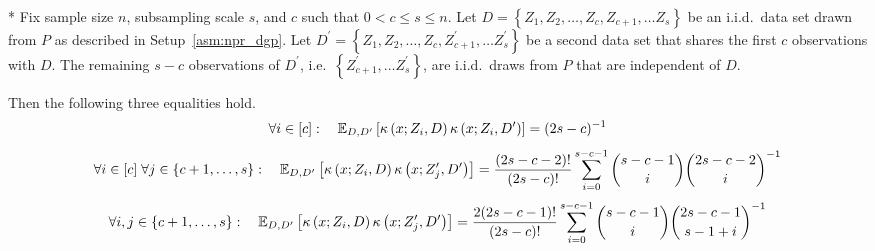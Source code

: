 \begin{lem}[]\label{lem:double_cond1}\mbox{}\\*
    Fix sample size $n$, subsampling scale $s$, and $c$ such that $0 < c \leq s \leq n$.
	Let $D = \left\{Z_1, Z_2, \dotsc, Z_c, Z_{c+1}, \dotsc Z_s \right\}$ be an i.i.d.\ data set drawn from $P$ as described in Setup~\ref{asm:npr_dgp}.
	Let $D^{\prime} = \left\{Z_1, Z_2, \dotsc, Z_c, Z_{c+1}^{\prime}, \dotsc Z_s^{\prime} \right\}$ be a second data set that shares the first $c$ observations with $D$.
	The remaining $s - c$ observations of $D^{\prime}$, i.e.\ $\left\{Z_{c+1}^{\prime}, \dotsc Z_s^{\prime} \right\}$, are i.i.d.\ draws from $P$ that are independent of $D$.

    Then the following three equalities hold.
    \begin{equation}
        \forall i \in [c]: \quad
        \mathbb{E}_{D, D^{\prime}}\left[\kappa\left(x; Z_{i}, D\right)\kappa\left(x; Z_{i}, D^{\prime}\right)\right]
        = (2s - c)^{-1}
    \end{equation}
    \begin{equation}
        \forall i \in [c] \; \forall j \in \{c+1, \dotsc, s\}: \quad
        \mathbb{E}_{D, D^{\prime}}\left[\kappa\left(x; Z_{i}, D\right)\kappa\left(x; Z_{j}^{\prime}, D^{\prime}\right)\right]
        = \frac{(2s - c - 2)!}{(2s - c)!}\sum_{i = 0}^{s - c - 1}\binom{s - c - 1}{i}\binom{2s - c - 2}{i}^{-1}
    \end{equation}
    \begin{equation}
        \forall i,j \in \{c+1, \dotsc, s\}: \quad
        \mathbb{E}_{D, D^{\prime}}\left[\kappa\left(x; Z_{i}, D\right)\kappa\left(x; Z_{j}^{\prime}, D^{\prime}\right)\right]
        = \frac{2(2s - c - 1)!}{(2s-c)!} \sum_{i = 0}^{s-c-1} \binom{s - c - 1}{i}\binom{2s - c - 1}{s-1+i}^{-1}
    \end{equation}
\end{lem}

